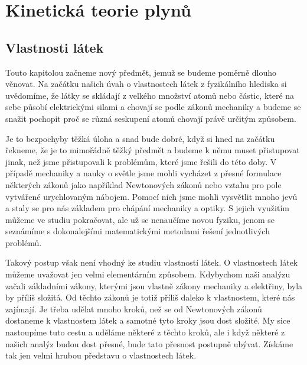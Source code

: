 \setchaptertoc
\chapter{Kinetická teorie plynů}\label{fyz:IchapIXL}  
  \section{Vlastnosti látek}\label{fyz:IchapIXLsecI}
    Touto kapitolou začneme nový předmět, jemuž se budeme poměrně dlouho věnovat. Na začátku našich
    úvah o vlastnostech látek z fyzikálního hlediska si uvědomíme, že látky se skládají z velkého
    množství atomů nebo částic, které na sebe působí elektrickými silami a chovají se podle zákonů
    mechaniky a budeme se snažit pochopit proč se různá seskupení atomů chovají právě určitým
    způsobem.
    
    Je to bezpochyby těžká úloha a snad bude dobré, když si hned na začátku řekneme, že je to
    mimořádně těžký předmět a budeme k němu muset přistupovat jinak, než jsme přistupovali k
    problémům, které jsme řešili do této doby. V případě mechaniky a nauky o světle jsme mohli
    vycházet z přesné formulace některých zákonů jako například Newtonových zákonů nebo vztahu pro
    pole vytvářené urychlovaným nábojem. Pomocí nich jsme mohli vysvětlit mnoho jevů a staly se pro
    nás základem pro chápání mechaniky a optiky. S jejich využitím můžeme ve studiu pokračovat, ale
    už se nenaučíme novou fyziku, jenom se seznámíme s dokonalejšími matematickými metodami řešení
    jednotlivých problémů.
    
    Takový postup však není vhodný ke studiu vlastností látek. O vlastnostech látek můžeme uvažovat
    jen velmi elementárním způsobem. Kdybychom naši analýzu začali základními zákony, kterými jsou
    vlastně zákony mechaniky a elektřiny, byla by příliš složitá. Od těchto zákonů je totiž příliš
    daleko k vlastnostem, které nás zajímají. Je třeba udělat mnoho kroků, než se od Newtonových
    zákonů dostaneme k vlastnostem látek a samotné tyto kroky jsou dost složité. My sice nastoupíme
    tuto cestu a uděláme některé z těchto kroků, ale i když některé z našich analýz budou dost
    přesné, bude tato přesnost postupně ubývat. Získáme tak jen velmi hrubou představu o
    vlastnostech látek.
    
